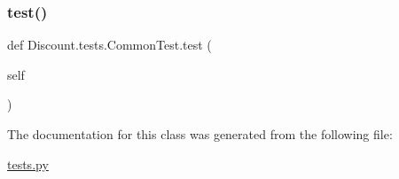 \subsubsection{\texorpdfstring{test()}{test()}}
{\footnotesize\ttfamily def Discount.\+tests.\+Common\+Test.\+test (\begin{DoxyParamCaption}\item[{}]{self }\end{DoxyParamCaption})}



The documentation for this class was generated from the following file\+:\begin{DoxyCompactItemize}
\item 
\hyperlink{tests_8py}{tests.\+py}\end{DoxyCompactItemize}
